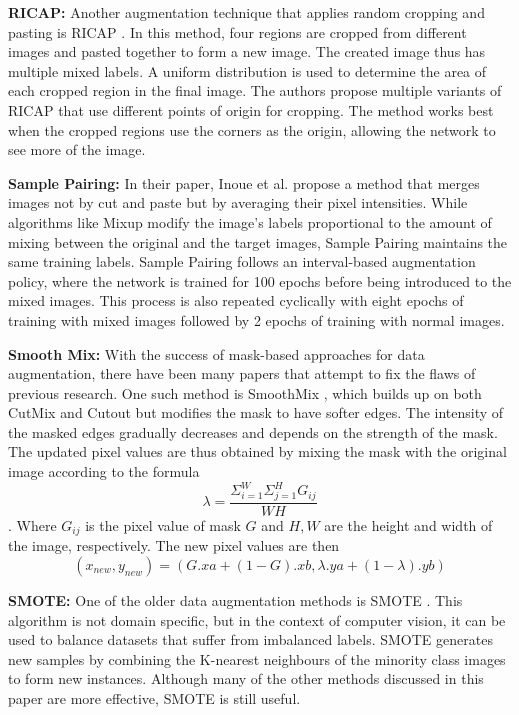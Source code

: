 \textbf{RICAP: }
Another augmentation technique that applies random cropping and pasting is RICAP \cite{takahashiDataAugmentationUsing2020}. In this method, four regions are cropped from different images and pasted together to form a new image. The created image thus has multiple mixed labels. A uniform distribution is used to determine the area of each cropped region in the final image. The authors propose multiple variants of RICAP that use different points of origin for cropping. The method works best when the cropped regions use the corners as the origin, allowing the network to see more of the image.

\textbf{Sample Pairing: }
In their paper, Inoue et al. propose a method that merges images not by cut and paste but by averaging their pixel intensities. While algorithms like Mixup \cite{zhangMixupEmpiricalRisk2018} modify the image's labels proportional to the amount of mixing between the original and the target images, Sample Pairing \cite{inoueDataAugmentationPairing2018} maintains the same training labels. Sample Pairing follows an interval-based augmentation policy, where the network is trained for 100 epochs before being introduced to the mixed images. This process is also repeated cyclically with eight epochs of training with mixed images followed by 2 epochs of training with normal images.

\textbf{Smooth Mix: }
With the success of mask-based approaches for data augmentation, there have been many papers that attempt to fix the flaws of previous research. One such method is SmoothMix \cite{leeSmoothMixSimpleEffective2020}, which builds up on both CutMix \cite{yunCutMixRegularizationStrategy2019} and Cutout \cite{devriesImprovedRegularizationConvolutional2017} but modifies the mask to have softer edges. The intensity of the masked edges gradually decreases and depends on the strength of the mask. The updated pixel values are thus obtained by mixing the mask with the original image according to the formula $$\lambda= \frac{\Sigma_{i=1}^{W}\Sigma_{j=1}^{H}G_{ij}}{WH}$$. Where $G_{ij}$ is the pixel value of mask $G$ and $H,W$ are the height and width of the image, respectively. The new pixel values are then $$(x_{new} , y_{new}) = (G.xa + (1 - G).xb , \lambda.ya + (1 - \lambda).yb)$$

\textbf{SMOTE: }
One of the older data augmentation methods is SMOTE \cite{SMOTESyntheticMinority}. This algorithm is not domain specific, but in the context of computer vision, it can be used to balance datasets that suffer from imbalanced labels. SMOTE generates new samples by combining the K-nearest neighbours of the minority class images to form new instances. Although many of the other methods discussed in this paper are more effective, SMOTE is still useful.

